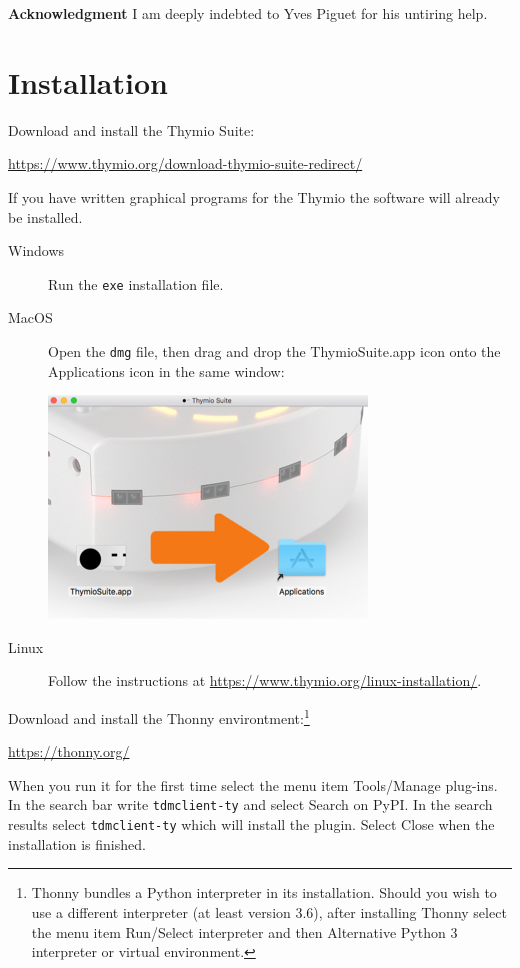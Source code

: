 \documentclass[11pt,a4paper]{article}
\newcommand*{\bu}[1]{\textsf{\small #1}}
\begin{document}
\textbf{Acknowledgment} I am deeply indebted to Yves Piguet for his untiring help.

\newpage


\section{Installation}\label{s.installation}

Download and install the Thymio Suite:
\begin{center}
\url{https://www.thymio.org/download-thymio-suite-redirect/}
\end{center}
If you have written graphical programs for the Thymio the software will already be installed.

\begin{description}
\item[Windows] Run the \texttt{exe} installation file.
\item[MacOS] Open the \texttt{dmg} file, then drag and drop the \bu{ThymioSuite.app} icon onto the Applications icon in the same window:
\begin{center}
\includegraphics*[width=.4\textwidth]{mac-installation.png}
\end{center}
\item[Linux] Follow the instructions at \url{https://www.thymio.org/linux-installation/}.
\end{description}

Download and install the Thonny environtment:\footnote{Thonny bundles a Python interpreter in its installation. Should you wish to use a different interpreter (at least version 3.6), after installing Thonny select the menu item  \bu{\footnotesize Run/Select interpreter} and then \bu{\footnotesize Alternative Python 3 interpreter or virtual environment}.}
\begin{center}
\url{https://thonny.org/}
\end{center}
When you run it for the first time select the menu item \bu{Tools/Manage plug-ins}. In the search bar write \verb+tdmclient-ty+ and select \bu{Search on PyPI}. In the search results select \verb+tdmclient-ty+ which will install the plugin. Select \bu{Close} when the installation is finished.
\end{document}
